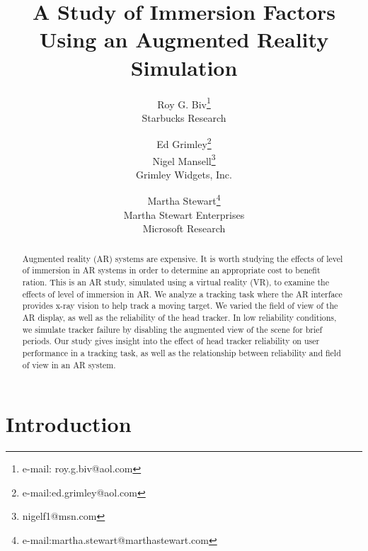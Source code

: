 \documentclass{acmsiggraph}                     %
\title{A Study of Immersion Factors Using an Augmented Reality Simulation}
\author{
Roy G. Biv\thanks{e-mail: roy.g.biv@aol.com}\\ Starbucks Research %
\and Ed Grimley\thanks{e-mail:ed.grimley@aol.com}\\Nigel Mansell\thanks{nigelf1@msn.com}\\ Grimley Widgets, Inc. %
\and Martha Stewart\thanks{e-mail:martha.stewart@marthastewart.com}\\ Martha Stewart Enterprises \\ Microsoft Research
}
\begin{document}


\maketitle


\begin{abstract}

Augmented reality (AR) systems are expensive.  It is worth studying the effects of level of immersion in AR systems in order to determine an appropriate cost to benefit ration.  This is an AR study, simulated using a virtual reality (VR), to examine the effects of level of immersion in AR.  We analyze a tracking task where the AR interface provides x-ray vision to help track a moving target.  We varied the field of view of the AR display, as well as the reliability of the head tracker.  In low reliability conditions, we simulate tracker failure by disabling the augmented view of the scene for brief periods.  Our study gives insight into the effect of head tracker reliability on user performance in a tracking task, as well as the relationship between reliability and field of view in an AR system.

\end{abstract}


\begin{CRcatlist}
\end{CRcatlist}

\keywordlist

\section{Introduction}
\end{document}
